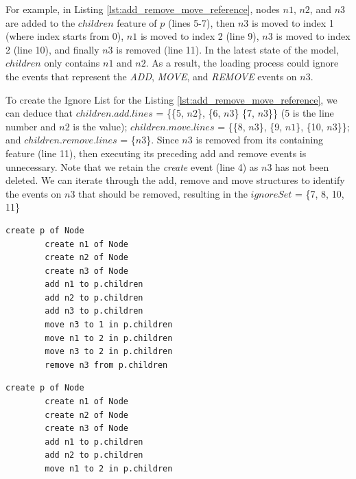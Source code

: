 \documentclass{llncs}
\begin{document}
    For example, in Listing \ref{lst:add_remove_move_reference},  nodes $n1$, $n2$, and $n3$ are added to the $children$ feature of $p$ (lines 5-7), then $n3$ is moved to index 1 (where index starts from 0), $n1$ is moved to index 2 (line 9), $n3$ is moved to index 2 (line 10), and finally $n3$ is removed (line 11).  In the latest state of the model, $children$ only contains $n1$ and $n2$. As a result, the loading process could ignore the events that represent the \textit{ADD}, \textit{MOVE}, and \textit{REMOVE} events on $n3$. 
    
    To create the Ignore List for the Listing \ref{lst:add_remove_move_reference}, we can deduce that $children$.$add$.$lines$ = \{\{5, $n2$\}, \{6, $n3$\} \{7, $n3$\}\} (5 is the line number and $n2$ is the value); $children$.$move$.$lines$ = \{\{8, $n3$\}, \{9, $n1$\}, \{10, $n3$\}\}; and $children$.$remove$.$lines$ = \{$n$3\}. Since $n3$ is removed from its containing feature (line 11), then executing its preceding add and remove events is unnecessary. Note that we retain the \textit{create} event (line 4) as $n3$ has not been deleted.  We can iterate through the add, remove and move structures to identify the events on $n3$ that should be removed, resulting in the $ignoreSet$ = \{7, 8, 10, 11\}
    
    \noindent
    \begin{minipage}[t]{0.48\linewidth}
        \begin{lstlisting}[style=eol,caption={A CBP representation of add, move, and remove operations.},label=lst:add_remove_move_reference]
        create p of Node
        create n1 of Node
        create n2 of Node
        create n3 of Node
        add n1 to p.children        
        add n2 to p.children        
        add n3 to p.children        
        move n3 to 1 in p.children  
        move n1 to 2 in p.children  
        move n3 to 2 in p.children
        remove n3 from p.children   
        \end{lstlisting}
    \end{minipage}
    \hfill
    \begin{minipage}[t]{0.48\linewidth}
        \begin{lstlisting}[style=eol,caption={The optimised CBP representation of Listing \ref{lst:add_remove_move_reference}},label=lst:optimised_add_remove_move_reference]
        create p of Node
        create n1 of Node
        create n2 of Node
        create n3 of Node
        add n1 to p.children        
        add n2 to p.children  
        move n1 to 2 in p.children
        \end{lstlisting}
    \end{minipage}
    
\end{document}
